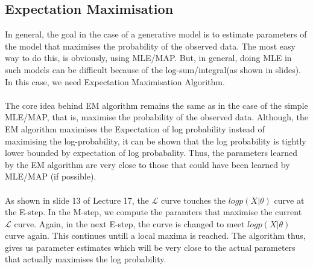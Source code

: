 \documentclass{article}
\begin{document}
\subsection{Expectation Maximisation}
In general, the goal in the case of a generative model is to estimate parameters of the model that maximises the probability of the observed data. The most easy way to do this, is obviously, using MLE/MAP. But, in general, doing MLE in such models can be difficult because of the log-sum/integral(as shown in slides). In this case, we need Expectation Maximisation Algorithm. \\ \\
The core idea behind EM algorithm remains the same as in the case of the simple MLE/MAP, that is, maximise the probability of the observed data. Although, the EM algorithm maximises the Expectation of log probability instead of maximising the log-probability, it can be shown that the log probability is tightly lower bounded by expectation of log probabality. Thus, the parameters learned by the EM algorithm are very close to those that could have been learned by MLE/MAP (if possible). \\ \\
As shown in slide 13 of Lecture 17, the $\mathcal{L}$ curve touches the $log p(X|\theta)$ curve at the E-step. In the M-step, we compute the paramters that maximise the current $\mathcal{L}$ curve. Again, in the next E-step, the curve is changed to meet $log p(X|\theta)$ curve again. This continues untill a local maxima is reached. The algorithm thus, gives us parameter estimates which will be very close to the actual parameters that actually maximises the log probability.
\end{document}
